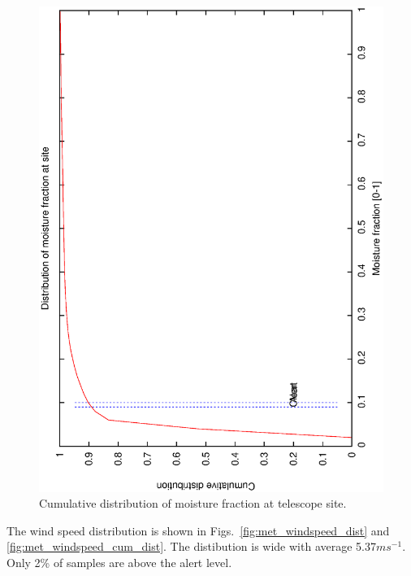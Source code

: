 \begin{figure}[htbp]
\begin{center}
    \includegraphics[scale=0.4, angle=-90]{figures/ecs/moist_cum.dat.eps}
\caption[Cumulative distribution of moisture fraction at telescope site.]
{Cumulative distribution of moisture fraction at telescope site.}
\end{center} 
  \label{fig:met_moisture_cum_dist}
\end{figure}



The wind speed distribution is shown in Figs.~\ref{fig:met_windspeed_dist} and \ref{fig:met_windspeed_cum_dist}. The distibution is wide with average 5.37$ms^{-1}$. Only 2\% of samples are above the alert level.

